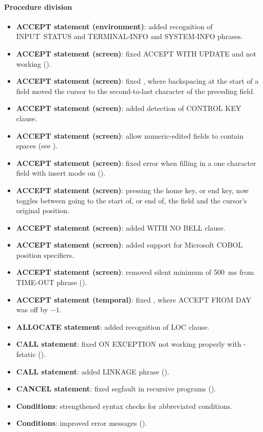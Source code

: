 \paragraph{Procedure division}
\begin{itemize}
\item \textbf{ACCEPT statement (environment)}: added recognition of INPUT~STATUS and TERMINAL-INFO and SYSTEM-INFO phrases.
\item \textbf{ACCEPT statement (screen)}: fixed ACCEPT WITH UPDATE and not working ().
\item \textbf{ACCEPT statement (screen)}: fixed , where backspacing at the start of a field moved the cursor to the second-to-last character of the preceding field.
\item \textbf{ACCEPT statement (screen)}: added detection of CONTROL KEY clause.
\item \textbf{ACCEPT statement (screen)}: allow numeric-edited fields to contain spaces (see ).
\item \textbf{ACCEPT statement (screen)}: fixed error when filling in a one character field with insert mode on ().
\item \textbf{ACCEPT statement (screen)}: pressing the home key, or end key, now toggles between going to the start of, or end of, the field and the cursor's original position.
\item \textbf{ACCEPT statement (screen)}: added WITH NO BELL clause.
\item \textbf{ACCEPT statement (screen)}: added support for Microsoft COBOL position specifiers.
\item \textbf{ACCEPT statement (screen)}: removed silent minimum of 500~ms from TIME-OUT phrase ().
\item \textbf{ACCEPT statement (temporal)}: fixed , where ACCEPT FROM DAY was off by $-1$.
\item \textbf{ALLOCATE statement}: added recognition of LOC clause.
\item \textbf{CALL statement}: fixed ON EXCEPTION not working properly with -fstatic ().
\item \textbf{CALL statement}: added LINKAGE phrase ().
\item \textbf{CANCEL statement}: fixed segfault in recursive programs ().
\item \textbf{Conditions}: strengthened syntax checks for abbreviated conditions.
\item \textbf{Conditions}: improved error messages ().

\end{itemize}

